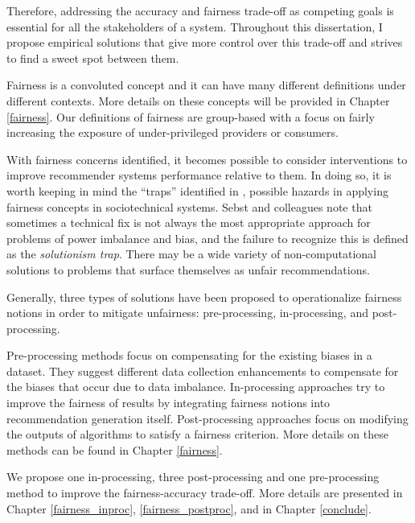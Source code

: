 


Therefore, addressing the accuracy and fairness trade-off as competing goals is essential for all the stakeholders of a system. Throughout this dissertation, I propose empirical solutions that give more control over this trade-off and strives to find a sweet spot between them. 

Fairness is a convoluted concept and it can have many different definitions under different contexts. More details on these concepts will be provided in Chapter \ref{fairness}. Our definitions of fairness are group-based with a focus on fairly increasing the exposure of under-privileged providers or consumers. 

With fairness concerns identified, it becomes possible to consider interventions to improve recommender systems performance relative to them. 
In doing so, it is worth keeping in mind the ``traps'' identified in \cite{selbst2019fairness}, possible hazards in applying fairness concepts in sociotechnical systems. Sebst and colleagues note that sometimes a technical fix is not always the most appropriate approach for problems of power imbalance and bias, and the failure to recognize this is defined as the \textit{solutionism trap}. There may be a wide variety of non-computational solutions to problems that surface themselves as unfair recommendations. 


Generally, three types of solutions have been proposed to operationalize fairness notions in order to mitigate  unfairness: pre-processing, in-processing, and post-processing.

Pre-processing methods focus on compensating for the existing biases in a dataset. They suggest different data collection enhancements to compensate for the biases that occur due to data imbalance. In-processing approaches try to improve the fairness of results by integrating fairness notions into recommendation generation itself. Post-processing approaches focus on modifying the outputs of algorithms to satisfy a fairness criterion. More details on these methods can be found in Chapter \ref{fairness}.

We propose one in-processing, three post-processing and one pre-processing method to improve the fairness-accuracy trade-off. More details are presented in Chapter \ref{fairness_inproc}, \ref{fairness_postproc}, and in Chapter \ref{conclude}.

